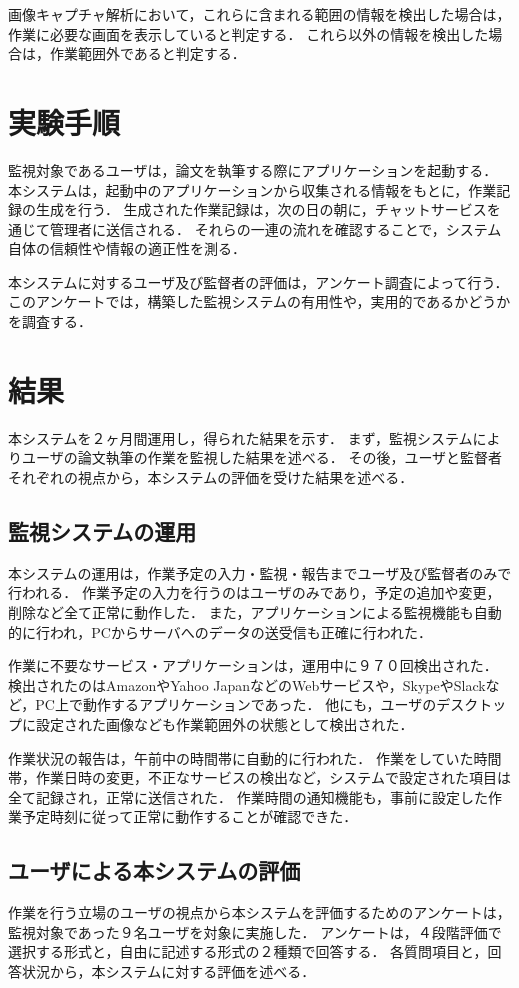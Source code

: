 画像キャプチャ解析において，これらに含まれる範囲の情報を検出した場合は，作業に必要な画面を表示していると判定する．
これら以外の情報を検出した場合は，作業範囲外であると判定する．

\section{実験手順}
監視対象であるユーザは，論文を執筆する際にアプリケーションを起動する．
本システムは，起動中のアプリケーションから収集される情報をもとに，作業記録の生成を行う．
生成された作業記録は，次の日の朝に，チャットサービスを通じて管理者に送信される．
それらの一連の流れを確認することで，システム自体の信頼性や情報の適正性を測る．

本システムに対するユーザ及び監督者の評価は，アンケート調査によって行う．
このアンケートでは，構築した監視システムの有用性や，実用的であるかどうかを調査する．

\section{結果}
本システムを２ヶ月間運用し，得られた結果を示す．
まず，監視システムによりユーザの論文執筆の作業を監視した結果を述べる．
その後，ユーザと監督者それぞれの視点から，本システムの評価を受けた結果を述べる．

\subsection{監視システムの運用}
本システムの運用は，作業予定の入力・監視・報告までユーザ及び監督者のみで行われる．
作業予定の入力を行うのはユーザのみであり，予定の追加や変更，削除など全て正常に動作した．
また，アプリケーションによる監視機能も自動的に行われ，PCからサーバへのデータの送受信も正確に行われた．

作業に不要なサービス・アプリケーションは，運用中に９７０回検出された．
検出されたのはAmazonやYahoo JapanなどのWebサービスや，SkypeやSlackなど，PC上で動作するアプリケーションであった．
他にも，ユーザのデスクトップに設定された画像なども作業範囲外の状態として検出された．

作業状況の報告は，午前中の時間帯に自動的に行われた．
作業をしていた時間帯，作業日時の変更，不正なサービスの検出など，システムで設定された項目は全て記録され，正常に送信された．
作業時間の通知機能も，事前に設定した作業予定時刻に従って正常に動作することが確認できた．

\subsection{ユーザによる本システムの評価}
作業を行う立場のユーザの視点から本システムを評価するためのアンケートは，監視対象であった９名ユーザを対象に実施した．
アンケートは，４段階評価で選択する形式と，自由に記述する形式の２種類で回答する．
各質問項目と，回答状況から，本システムに対する評価を述べる．

